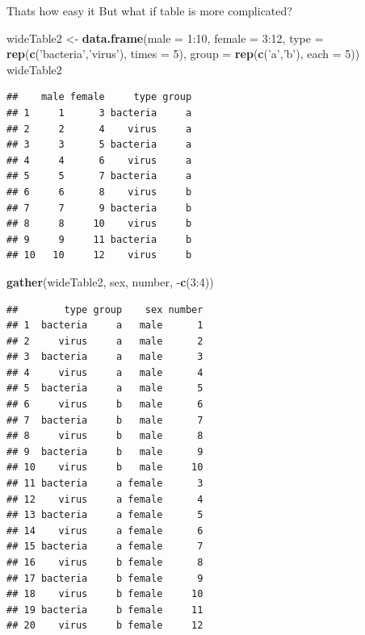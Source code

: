 \documentclass[]{book}
\newenvironment{Shaded}{\begin{snugshade}}{\end{snugshade}}
\newcommand{\KeywordTok}[1]{\textcolor[rgb]{0.12,0.11,0.11}{\textbf{#1}}}
\newcommand{\DataTypeTok}[1]{\textcolor[rgb]{0.00,0.34,0.68}{#1}}
\newcommand{\DecValTok}[1]{\textcolor[rgb]{0.69,0.50,0.00}{#1}}
\newcommand{\StringTok}[1]{\textcolor[rgb]{0.75,0.01,0.01}{#1}}
\newcommand{\OperatorTok}[1]{\textcolor[rgb]{0.12,0.11,0.11}{#1}}
\newcommand{\NormalTok}[1]{\textcolor[rgb]{0.12,0.11,0.11}{#1}}
\theoremstyle{definition}
\theoremstyle{definition}
\theoremstyle{definition}
\theoremstyle{remark}
\begin{document}
Thats how easy it But what if table is more complicated?

\begin{Shaded}
\begin{Highlighting}[]
\NormalTok{wideTable2 <-}\StringTok{ }\KeywordTok{data.frame}\NormalTok{(}\DataTypeTok{male =} \DecValTok{1}\OperatorTok{:}\DecValTok{10}\NormalTok{,}
                         \DataTypeTok{female =} \DecValTok{3}\OperatorTok{:}\DecValTok{12}\NormalTok{, }
                         \DataTypeTok{type =} \KeywordTok{rep}\NormalTok{(}\KeywordTok{c}\NormalTok{(}\StringTok{'bacteria'}\NormalTok{,}\StringTok{'virus'}\NormalTok{), }\DataTypeTok{times =} \DecValTok{5}\NormalTok{),}
                         \DataTypeTok{group =} \KeywordTok{rep}\NormalTok{(}\KeywordTok{c}\NormalTok{(}\StringTok{'a'}\NormalTok{,}\StringTok{'b'}\NormalTok{), }\DataTypeTok{each =} \DecValTok{5}\NormalTok{))}
\NormalTok{wideTable2}
\end{Highlighting}
\end{Shaded}

\begin{verbatim}
##    male female     type group
## 1     1      3 bacteria     a
## 2     2      4    virus     a
## 3     3      5 bacteria     a
## 4     4      6    virus     a
## 5     5      7 bacteria     a
## 6     6      8    virus     b
## 7     7      9 bacteria     b
## 8     8     10    virus     b
## 9     9     11 bacteria     b
## 10   10     12    virus     b
\end{verbatim}

\begin{Shaded}
\begin{Highlighting}[]
\KeywordTok{gather}\NormalTok{(wideTable2, sex, number, }\OperatorTok{-}\KeywordTok{c}\NormalTok{(}\DecValTok{3}\OperatorTok{:}\DecValTok{4}\NormalTok{))}
\end{Highlighting}
\end{Shaded}

\begin{verbatim}
##        type group    sex number
## 1  bacteria     a   male      1
## 2     virus     a   male      2
## 3  bacteria     a   male      3
## 4     virus     a   male      4
## 5  bacteria     a   male      5
## 6     virus     b   male      6
## 7  bacteria     b   male      7
## 8     virus     b   male      8
## 9  bacteria     b   male      9
## 10    virus     b   male     10
## 11 bacteria     a female      3
## 12    virus     a female      4
## 13 bacteria     a female      5
## 14    virus     a female      6
## 15 bacteria     a female      7
## 16    virus     b female      8
## 17 bacteria     b female      9
## 18    virus     b female     10
## 19 bacteria     b female     11
## 20    virus     b female     12
\end{verbatim}
\end{document}
